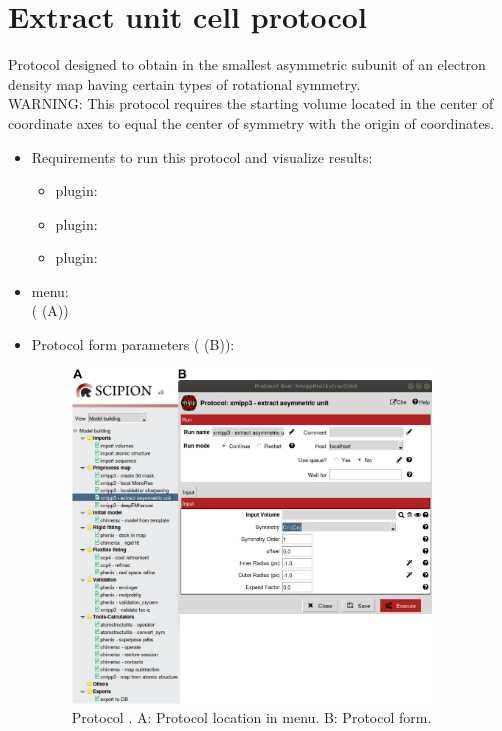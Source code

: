 \section{Extract unit cell protocol}
\label{app:extractUnitCell}%
Protocol designed to obtain in \scipion the smallest asymmetric subunit of an electron density map having certain types of rotational symmetry.\\
WARNING: This protocol requires the starting volume located in the center of coordinate axes to equal the center of symmetry with the origin of coordinates.

\begin{itemize}
  \item Requirements to run this protocol and visualize results:
    \begin{itemize}
        \item \scipion plugin: 
        \item \scipion plugin: 
        \item \scipion plugin: 
    \end{itemize}
  \item \scipion menu:\\
   ( (A))
  
  \item Protocol form parameters ( (B)):
  
  \begin{figure}[H]
    \centering 
    \captionsetup{width=.7\linewidth} 
    \includegraphics[width=0.90\textwidth]{Images_appendix/Fig107.pdf}
    \caption{Protocol . A: Protocol location in \scipion menu. B: Protocol form.}
    \label{fig:app_protocol_extractUnitCell_1}
   \end{figure}
  

\end{itemize}
